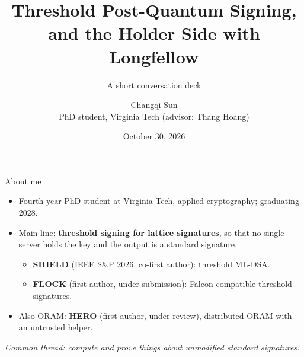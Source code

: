 \documentclass[aspectratio=169,11pt]{beamer}
\title{Threshold Post-Quantum Signing,\\and the Holder Side with Longfellow}
\subtitle{A short conversation deck}
\author{Changqi Sun\\{\small PhD student, Virginia Tech (advisor: Thang Hoang)}}
\date{October 30, 2026}
\begin{document}
\maketitle

\begin{frame}{About me}
\begin{itemize}
  \item Fourth-year PhD student at Virginia Tech, applied cryptography; graduating 2028.
  \item Main line: \textbf{threshold signing for lattice signatures}, so that no single server
        holds the key and the output is a \alert{standard signature}.
  \begin{itemize}
    \item \textbf{SHIELD} (IEEE S\&P 2026, co-first author): threshold ML-DSA.
    \item \textbf{FLOCK} (first author, under submission): Falcon-compatible threshold signatures.
  \end{itemize}
  \item Also ORAM: \textbf{HERO} (first author, under review), distributed ORAM with an untrusted helper.
\end{itemize}
\vspace{.4em}
\textit{Common thread: compute and prove things about \alert{unmodified standard signatures}.}
\end{frame}
\end{document}
